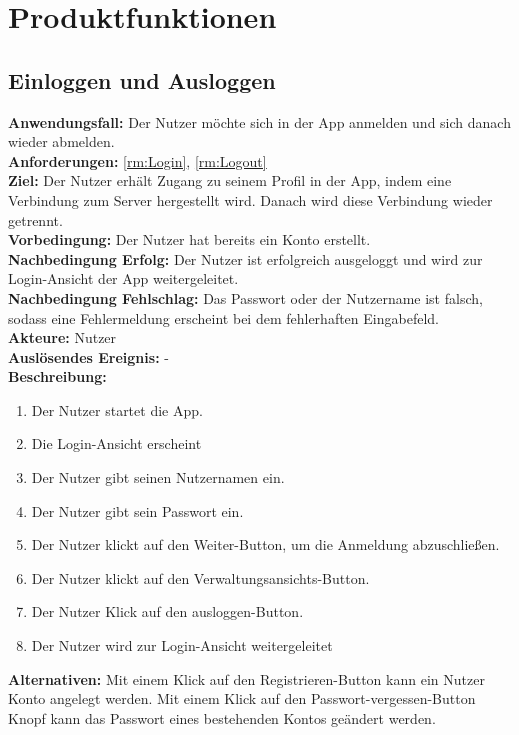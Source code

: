 \documentclass[parskip=full]{scrartcl}
\newcommand{\changelocaltocdepth}[1]{%
  \addtocontents{toc}{\protect\setcounter{tocdepth}{#1}}%
  \setcounter{tocdepth}{#1}%
}
\newcommand{\enablesubsectionnumbering}[1]{
    \renewcommand{\thesubsection}{$\langle$#1\arabic{subsection}0$\rangle$}
    \changelocaltocdepth{1} 
}
\begin{document}
\section{Produktfunktionen}

\enablesubsectionnumbering{F}
\subsection{Einloggen und Ausloggen}
\textbf{Anwendungsfall:} Der Nutzer möchte sich in der App anmelden und sich danach wieder abmelden.\\
\textbf{Anforderungen:} \ref{rm:Login}, \ref{rm:Logout}\\
\textbf{Ziel:} Der Nutzer erhält Zugang zu seinem Profil in der App, indem eine Verbindung zum Server hergestellt wird. Danach wird diese Verbindung wieder getrennt.\\
\textbf{Vorbedingung:} Der Nutzer hat bereits ein Konto erstellt.\\
\textbf{Nachbedingung Erfolg:} Der Nutzer ist erfolgreich ausgeloggt und wird zur Login-Ansicht der App weitergeleitet.\\
\textbf{Nachbedingung Fehlschlag:} Das Passwort oder der Nutzername ist falsch, sodass eine Fehlermeldung erscheint bei dem fehlerhaften Eingabefeld.\\
\textbf{Akteure:} Nutzer\\
\textbf{Auslösendes Ereignis:} -\\
\textbf{Beschreibung:}
\begin{enumerate}
    \item Der Nutzer startet die App.
    \item Die Login-Ansicht erscheint
    \item Der Nutzer gibt seinen Nutzernamen ein.
    \item Der Nutzer gibt sein Passwort ein.
    \item Der Nutzer klickt auf den Weiter-Button, um die Anmeldung abzuschließen.
    \item Der Nutzer klickt auf den Verwaltungsansichts-Button.
    \item Der Nutzer Klick auf den ausloggen-Button.
    \item Der Nutzer wird zur Login-Ansicht weitergeleitet
\end{enumerate}
\textbf{Alternativen:} Mit einem Klick auf den Registrieren-Button kann ein Nutzer Konto angelegt werden. Mit einem Klick auf den Passwort-vergessen-Button Knopf kann das Passwort eines bestehenden Kontos geändert werden.
\newpage
\end{document}
